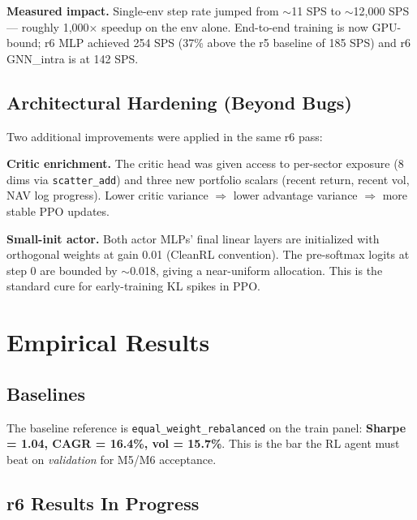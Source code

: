 \documentclass[11pt,a4paper]{article}
\begin{document}
\textbf{Measured impact.} Single-env step rate jumped from $\sim$11 SPS to
$\sim$12{,}000 SPS --- roughly 1{,}000$\times$ speedup on the env alone. End-to-end
training is now GPU-bound; r6 MLP achieved 254 SPS (37\% above the r5 baseline
of 185 SPS) and r6 GNN\_intra is at 142 SPS.

\subsection{Architectural Hardening (Beyond Bugs)}

Two additional improvements were applied in the same r6 pass:

\textbf{Critic enrichment.} The critic head was given access to per-sector
exposure (8 dims via \texttt{scatter\_add}) and three new portfolio scalars
(recent return, recent vol, NAV log progress). Lower critic variance
$\Rightarrow$ lower advantage variance $\Rightarrow$ more stable PPO updates.

\textbf{Small-init actor.} Both actor MLPs' final linear layers are initialized
with orthogonal weights at gain 0.01 (CleanRL convention). The pre-softmax logits
at step 0 are bounded by $\sim$0.018, giving a near-uniform allocation. This is the
standard cure for early-training KL spikes in PPO.

\section{Empirical Results}

\subsection{Baselines}

The baseline reference is \texttt{equal\_weight\_rebalanced} on the train panel:
\textbf{Sharpe = 1.04, CAGR = 16.4\%, vol = 15.7\%}. This is the bar the RL agent
must beat on \emph{validation} for M5/M6 acceptance.

\subsection{r6 Results In Progress}
\end{document}
